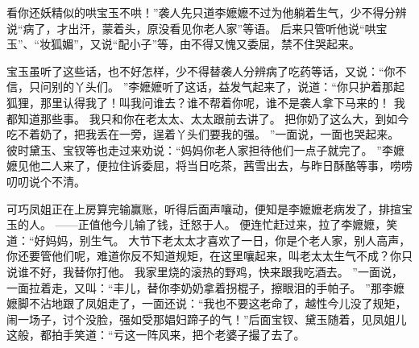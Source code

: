 看你还妖精似的哄宝玉不哄！”袭人先只道李嬷嬷不过为他躺着生气，少不得分辨说“病了，才出汗，蒙着头，原没看见你老人家”等语。
后来只管听他说“哄宝玉”、“妆狐媚”，又说“配小子”等，由不得又愧又委屈，禁不住哭起来。
\par
宝玉虽听了这些话，也不好怎样，少不得替袭人分辨病了吃药等话，又说：“你不信，只问别的丫头们。
”李嬷嬷听了这话，益发气起来了，说道：“你只护着那起狐狸，那里认得我了！叫我问谁去？谁不帮着你呢，谁不是袭人拿下马来的！
我都知道那些事。
我只和你在老太太、太太跟前去讲了。
把你奶了这么大，到如今吃不着奶了，把我丢在一旁，逞着丫头们要我的强。
”一面说，一面也哭起来。
彼时黛玉、宝钗等也走过来劝说：“妈妈你老人家担待他们一点子就完了。
”李嬷嬷见他二人来了，便拉住诉委屈，将当日吃茶，茜雪出去，与昨日酥酪等事，唠唠叨叨说个不清。
\par
可巧凤姐正在上房算完输赢账，听得后面声嚷动，便知是李嬷嬷老病发了，排揎宝玉的人。
——正值他今儿输了钱，迁怒于人。
便连忙赶过来，拉了李嬷嬷，笑道：“好妈妈，别生气。
大节下老太太才喜欢了一日，你是个老人家，别人高声，你还要管他们呢，难道你反不知道规矩，在这里嚷起来，叫老太太生气不成？你只说谁不好，我替你打他。
我家里烧的滚热的野鸡，快来跟我吃酒去。
”一面说，一面拉着走，又叫：“丰儿，替你李奶奶拿着拐棍子，擦眼泪的手帕子。
”那李嬷嬷脚不沾地跟了凤姐走了，一面还说：“我也不要这老命了，越性今儿没了规矩，闹一场子，讨个没脸，强如受那娼妇蹄子的气！”后面宝钗、黛玉随着，见凤姐儿这般，都拍手笑道：“亏这一阵风来，把个老婆子撮了去了。
